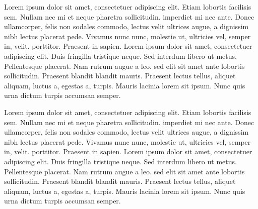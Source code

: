 \documentclass{memoir}
\begin{document}
\begin{pairs}
\begin{Leftside}
\beginnumbering
\pstart
Lorem ipsum dolor sit amet, consectetuer adipiscing elit. Etiam
lobortis facilisis sem. Nullam nec mi et neque pharetra
sollicitudin.  imperdiet mi nec ante. Donec ullamcorper,
felis non sodales commodo, lectus velit ultrices augue, a
dignissim nibh lectus placerat pede. Vivamus nunc nunc, molestie
ut, ultricies vel, semper in, velit.  porttitor. Praesent in
sapien. Lorem ipsum dolor sit amet, consectetuer adipiscing elit.
Duis fringilla tristique neque. Sed interdum libero ut metus.
Pellentesque placerat. Nam rutrum augue a leo. \textbf{} sed elit sit
amet ante lobortis sollicitudin. Praesent blandit blandit mauris.
Praesent lectus tellus, aliquet aliquam, luctus a, egestas a,
turpis. Mauris lacinia lorem sit ipsum. Nunc quis urna dictum
turpis accumsan semper.
\pend
\endnumbering
\end{Leftside}
\begin{Rightside}
\beginnumbering
\pstart
Lorem ipsum dolor sit amet, consectetuer adipiscing elit. Etiam
lobortis facilisis sem. Nullam nec mi et neque pharetra
sollicitudin.  imperdiet mi nec ante. Donec ullamcorper,
felis non sodales commodo, lectus velit ultrices augue, a
dignissim nibh lectus placerat pede. Vivamus nunc nunc, molestie
ut, ultricies vel, semper in, velit.  porttitor. Praesent in
sapien. Lorem ipsum dolor sit amet, consectetuer adipiscing elit.
Duis fringilla tristique neque. Sed interdum libero ut metus.
Pellentesque placerat. Nam rutrum augue a leo. \textbf{} sed elit sit
amet ante lobortis sollicitudin. Praesent blandit blandit mauris.
Praesent lectus tellus, aliquet aliquam, luctus a, egestas a,
turpis. Mauris lacinia lorem sit ipsum. Nunc quis urna dictum
turpis accumsan semper.
\pend
\endnumbering
\end{Rightside}
\end{pairs}
\Columns
\printglossary
\end{document}
